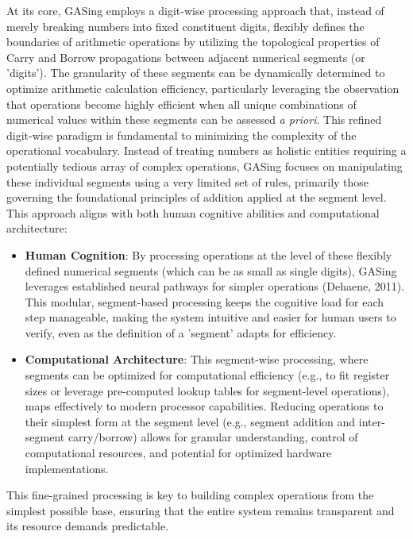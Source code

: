 At its core, GASing employs a digit-wise processing approach that, instead of merely breaking numbers into fixed constituent digits, flexibly defines the boundaries of arithmetic operations by utilizing the topological properties of Carry and Borrow propagations between adjacent numerical segments (or 'digits'). The granularity of these segments can be dynamically determined to optimize arithmetic calculation efficiency, particularly leveraging the observation that operations become highly efficient when all unique combinations of numerical values within these segments can be assessed \textit{a priori}. This refined digit-wise paradigm is fundamental to minimizing the complexity of the operational vocabulary. Instead of treating numbers as holistic entities requiring a potentially tedious array of complex operations, GASing focuses on manipulating these individual segments using a very limited set of rules, primarily those governing the foundational principles of addition applied at the segment level. This approach aligns with both human cognitive abilities and computational architecture:
\begin{itemize}
\item \textbf{Human Cognition}: By processing operations at the level of these flexibly defined numerical segments (which can be as small as single digits), GASing leverages established neural pathways for simpler operations (Dehaene, 2011). This modular, segment-based processing keeps the cognitive load for each step manageable, making the system intuitive and easier for human users to verify, even as the definition of a 'segment' adapts for efficiency.
\item \textbf{Computational Architecture}: This segment-wise processing, where segments can be optimized for computational efficiency (e.g., to fit register sizes or leverage pre-computed lookup tables for segment-level operations), maps effectively to modern processor capabilities. Reducing operations to their simplest form at the segment level (e.g., segment addition and inter-segment carry/borrow) allows for granular understanding, control of computational resources, and potential for optimized hardware implementations.

\end{itemize}
This fine-grained processing is key to building complex operations from the simplest possible base, ensuring that the entire system remains transparent and its resource demands predictable.
